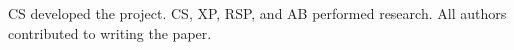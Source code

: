 CS developed the project. CS, XP, RSP, and AB performed research. All authors contributed to writing the paper.
